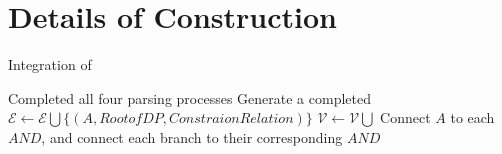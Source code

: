 \section{Details of \lawgraph{} Construction}
\label{dcon}

\begin{algorithm}
\small
\caption{Integration of \lawgraph{} }
\label{alg:Integration}
\begin{algorithmic}[1]
\Require Completed all four parsing processes
\Ensure Generate a completed \lawgraph{}
\State $\mathcal{E} \gets \mathcal{E} \bigcup \{(A, Root of DP, ConstraionRelation)\}$ 
\State $\mathcal{V} \gets \mathcal{V} \bigcup$ 
\State Connect \( A \) to each \( AND \), and connect each branch to their corresponding \( AND \)
\end{algorithmic}
\end{algorithm}



